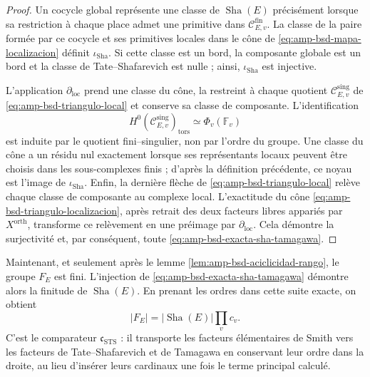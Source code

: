 \begin{proof}
Un cocycle global représente une classe de
\(\operatorname{Sha}(E)\) précisément lorsque sa restriction à chaque place
admet une primitive dans
\(\mathcal C_{E,v}^{\mathrm{fin}}\). La classe de la paire formée par ce
cocycle et ses primitives locales dans le cône de
\eqref{eq:amp-bsd-mapa-localizacion} définit
\(\iota_{\mathrm{Sha}}\). Si cette classe est un bord, la composante globale est un
bord et la classe de Tate--Shafarevich est nulle ; ainsi,
\(\iota_{\mathrm{Sha}}\) est injective.

L'application \(\partial_{\mathrm{loc}}\) prend une classe du cône, la restreint à
chaque quotient
\(\mathcal C_{E,v}^{\mathrm{sing}}\) de
\eqref{eq:amp-bsd-triangulo-local} et conserve sa classe de composante.
L'identification
\[
 H^0(\mathcal C_{E,v}^{\mathrm{sing}})_{\mathrm{tors}}
 \simeq\Phi_v(\mathbb F_v)
\]
est induite par le quotient fini--singulier, non par l'ordre du groupe.
Une classe du cône a un résidu nul exactement lorsque ses représentants
locaux peuvent être choisis dans les sous-complexes finis ; d'après la définition
précédente, ce noyau est l'image de \(\iota_{\mathrm{Sha}}\).
Enfin, la dernière flèche de
\eqref{eq:amp-bsd-triangulo-local} relève chaque classe de composante au
complexe local. L'exactitude du cône
\eqref{eq:amp-bsd-triangulo-localizacion}, après retrait des deux
facteurs libres appariés par \(X^{\mathrm{orth}}\), transforme ce
relèvement en une préimage par \(\partial_{\mathrm{loc}}\). Cela démontre
la surjectivité et, par conséquent, toute
\eqref{eq:amp-bsd-exacta-sha-tamagawa}.
\end{proof}

Maintenant, et seulement après le lemme
\ref{lem:amp-bsd-aciclicidad-rango}, le groupe \(F_E\) est fini.
L'injection de \eqref{eq:amp-bsd-exacta-sha-tamagawa} démontre alors la
finitude de \(\operatorname{Sha}(E)\). En prenant les ordres dans cette suite
exacte, on obtient
\begin{equation}\label{eq:amp-bsd-cardinal-smith}
 |F_E|=|\operatorname{Sha}(E)|\prod_v c_v.
\end{equation}
C'est le comparateur
\(\mathfrak c_{\mathrm{STS}}\) : il transporte les facteurs élémentaires de Smith
vers les facteurs de Tate--Shafarevich et de Tamagawa en conservant leur ordre dans la droite,
au lieu d'insérer leurs cardinaux une fois le terme principal calculé.

